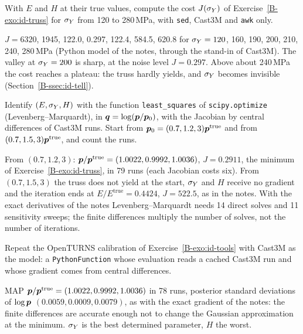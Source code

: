 
\label{exo:cc-id-sweep}
%
With $E$ and $H$ at their true values, compute the cost $J(\sigma_{Y})$ of
Exercise~\ref{B-exo:id-truss} for $\sigma_{Y}$ from 120 to 280\,MPa, with
\texttt{sed}, Cast3M and \texttt{awk} only.
\begin{solution}
$J=6320$, 1945, 122.0, 0.297, 122.4, 584.5, 620.8 for
$\sigma_{Y}=120$, 160, 190, 200, 210, 240, 280\,MPa (Python model of the notes,
through the stand-in of Cast3M). The valley at $\sigma_{Y}=200$ is sharp, at the noise
level $J=0.297$. Above about 240\,MPa the cost reaches a plateau: the truss
hardly yields, and $\sigma_{Y}$ becomes invisible (Section~\ref{B-ssec:id-tell}).

\end{solution}

\label{exo:cc-id-scipy}
%
Identify $(E,\sigma_{Y},H)$ with the function \texttt{least\_squares} of
\texttt{scipy.optimize} (Levenberg--Marquardt), in $\bm{q}=\log(\bm{p}/\bm{p}_0)$, with the Jacobian by central
differences of Cast3M runs. Start from $\bm{p}_0=(0.7,1.2,3)\bm{p}^{\mathrm{true}}$
and from $(0.7,1.5,3)\bm{p}^{\mathrm{true}}$, and count the runs.
\begin{solution}
From $(0.7,1.2,3)$: $\bm{p}/\bm{p}^{\mathrm{true}}=(1.0022,0.9992,1.0036)$,
$J=0.2911$, the minimum of Exercise~\ref{B-exo:id-truss}, in 79 runs (each
Jacobian costs six). From $(0.7,1.5,3)$ the truss does not yield at the start,
$\sigma_{Y}$ and $H$ receive no gradient and the iteration ends at
$E/E^{\mathrm{true}}=0.4424$, $J=522.5$, as in the notes. With the exact
derivatives of the notes Levenberg--Marquardt needs 14 direct solves and 11
sensitivity sweeps; the finite differences multiply the number of solves, not
the number of iterations.


\end{solution}

\label{exo:cc-id-ot}
%
Repeat the OpenTURNS calibration of Exercise~\ref{B-exo:id-tools} with
Cast3M as the model: a \texttt{PythonFunction} whose evaluation reads a cached
Cast3M run and whose gradient comes from central differences.
\begin{solution}
MAP $\bm{p}/\bm{p}^{\mathrm{true}}=(1.0022,0.9992,1.0036)$ in 78 runs, posterior
standard deviations of $\log\bm{p}$ $(0.0059,0.0009,0.0079)$, as with the exact
gradient of the notes: the finite differences are accurate enough not to change
the Gaussian approximation at the minimum. $\sigma_{Y}$ is the best determined
parameter, $H$ the worst.

\end{solution}

